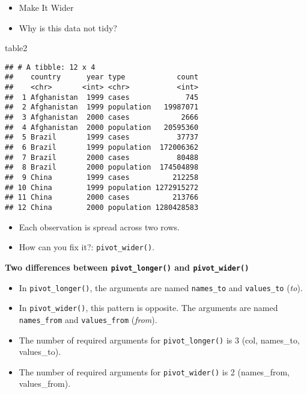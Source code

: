 \documentclass[
]{book}
\newenvironment{Shaded}{\begin{snugshade}}{\end{snugshade}}
\newcommand{\NormalTok}[1]{#1}
\begin{document}
\begin{itemize}
\item
  Make It Wider
\item
  Why is this data not tidy?
\end{itemize}

\begin{Shaded}
\begin{Highlighting}[]
\NormalTok{table2}
\end{Highlighting}
\end{Shaded}

\begin{verbatim}
## # A tibble: 12 x 4
##    country      year type            count
##    <chr>       <int> <chr>           <int>
##  1 Afghanistan  1999 cases             745
##  2 Afghanistan  1999 population   19987071
##  3 Afghanistan  2000 cases            2666
##  4 Afghanistan  2000 population   20595360
##  5 Brazil       1999 cases           37737
##  6 Brazil       1999 population  172006362
##  7 Brazil       2000 cases           80488
##  8 Brazil       2000 population  174504898
##  9 China        1999 cases          212258
## 10 China        1999 population 1272915272
## 11 China        2000 cases          213766
## 12 China        2000 population 1280428583
\end{verbatim}

\begin{itemize}
\item
  Each observation is spread across two rows.
\item
  How can you fix it?: \texttt{pivot\_wider()}.
\end{itemize}

\textbf{Two differences between \texttt{pivot\_longer()} and \texttt{pivot\_wider()}}

\begin{itemize}
\item
  In \texttt{pivot\_longer()}, the arguments are named \texttt{names\_to} and \texttt{values\_to} (\emph{to}).
\item
  In \texttt{pivot\_wider()}, this pattern is opposite. The arguments are named \texttt{names\_from} and \texttt{values\_from} (\emph{from}).
\item
  The number of required arguments for \texttt{pivot\_longer()} is 3 (col, names\_to, values\_to).
\item
  The number of required arguments for \texttt{pivot\_wider()} is 2 (names\_from, values\_from).
\end{itemize}
\end{document}
